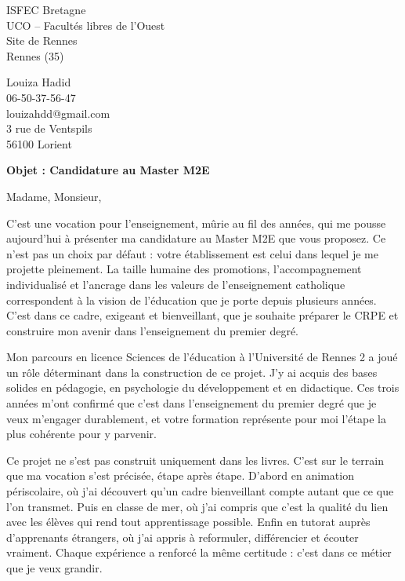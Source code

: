 \documentclass[12pt,a4paper]{letter}
\begin{document}
\begin{letter}{ISFEC Bretagne\\
UCO -- Facultés libres de l'Ouest\\
Site de Rennes\\
Rennes (35)}

\hspace{-2cm}
\begin{minipage}{0.45\textwidth}
Louiza Hadid\\
06-50-37-56-47\\
louizahdd@gmail.com\\
3 rue de Ventspils\\
56100 Lorient
\end{minipage}

\vspace{1cm}

\textbf{Objet : Candidature au Master M2E}

\opening{Madame, Monsieur,}

\hspace{1cm} C'est une vocation pour l'enseignement, mûrie au fil des années, qui me pousse aujourd'hui à présenter ma candidature au Master M2E que vous proposez. Ce n'est pas un choix par défaut : votre établissement est celui dans lequel je me projette pleinement. La taille humaine des promotions, l'accompagnement individualisé et l'ancrage dans les valeurs de l'enseignement catholique correspondent à la vision de l'éducation que je porte depuis plusieurs années. C'est dans ce cadre, exigeant et bienveillant, que je souhaite préparer le CRPE et construire mon avenir dans l'enseignement du premier degré.

\hspace{1cm} Mon parcours en licence Sciences de l'éducation à l'Université de Rennes 2 a joué un rôle déterminant dans la construction de ce projet. J'y ai acquis des bases solides en pédagogie, en psychologie du développement et en didactique. Ces trois années m'ont confirmé que c'est dans l'enseignement du premier degré que je veux m'engager durablement, et votre formation représente pour moi l'étape la plus cohérente pour y parvenir.

\hspace{1cm} Ce projet ne s'est pas construit uniquement dans les livres. C'est sur le terrain que ma vocation s'est précisée, étape après étape. D'abord en animation périscolaire, où j'ai découvert qu'un cadre bienveillant compte autant que ce que l'on transmet. Puis en classe de mer, où j'ai compris que c'est la qualité du lien avec les élèves qui rend tout apprentissage possible. Enfin en tutorat auprès d'apprenants étrangers, où j'ai appris à reformuler, différencier et écouter vraiment. Chaque expérience a renforcé la même certitude : c'est dans ce métier que je veux grandir.


\end{letter}
\end{document}
